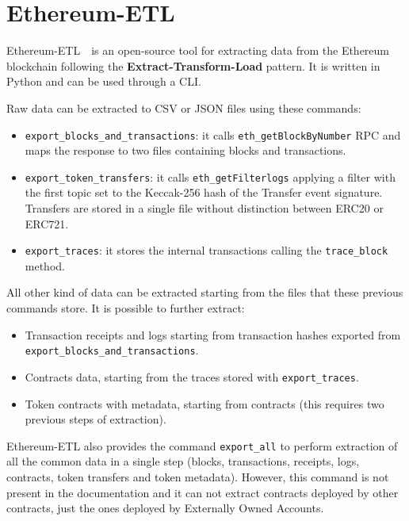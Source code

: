 \section{Ethereum-ETL}

Ethereum-ETL~\cite{ethereum-etl}~is an open-source tool for extracting data from the Ethereum blockchain following the \textbf{Extract-Transform-Load} pattern. It is written in Python and can be used through a CLI.

\noindent Raw data can be extracted to CSV or JSON files using these commands:

\begin{itemize}
    \item \verb|export_blocks_and_transactions|: it calls \verb|eth_getBlockByNumber| RPC and maps the response to two files containing blocks and transactions.
    \item \verb|export_token_transfers|: it calls \verb|eth_getFilterlogs| applying a filter with the first topic set to the Keccak-256 hash of the Transfer event signature. Transfers are stored in a single file without distinction between ERC20 or ERC721.   
    \item \verb|export_traces|: it stores the internal transactions calling the \verb|trace_block| method.
\end{itemize}

\noindent All other kind of data can be extracted starting from the files that these previous commands store. It is possible to further extract:

\begin{itemize}
    \item Transaction receipts and logs starting from transaction hashes exported from \verb|export_blocks_and_transactions|.
    \item Contracts data, starting from the traces stored with \verb|export_traces|.
    \item Token contracts with metadata, starting from contracts (this requires two previous steps of extraction). 
\end{itemize}

Ethereum-ETL also provides the command {\tt export\_all} to perform extraction of all the common data in a single step (blocks, transactions, receipts, logs, contracts, token transfers and token metadata). However, this command is not present in the documentation and it can not extract contracts deployed by other contracts, just the ones deployed by Externally Owned Accounts. 

